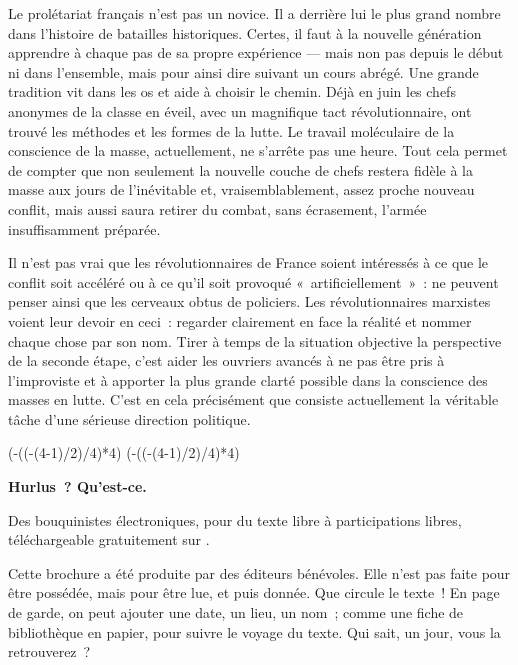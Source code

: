 \documentclass[french,twoside]{book} %
\newcommand\chapterclose{} %
\def\truncdiv#1#2{((#1-(#2-1)/2)/#2)}
\def\moduloop#1#2{(#1-\truncdiv{#1}{#2}*#2)}
\def\modulo#1#2{\number\numexpr\moduloop{#1}{#2}\relax}
\begin{document}
Le prolétariat français n’est pas un novice. Il a derrière lui le plus grand nombre dans l’histoire de batailles historiques. Certes, il faut à la nouvelle génération apprendre à chaque pas de sa propre expérience — mais non pas depuis le début ni dans l’ensemble, mais pour ainsi dire suivant un cours abrégé. Une grande tradition vit dans les os et aide à choisir le chemin. Déjà en juin les chefs anonymes de la classe en éveil, avec un magnifique tact révolutionnaire, ont trouvé les méthodes et les formes de la lutte. Le travail moléculaire de la conscience de la masse, actuellement, ne s’arrête pas une heure. Tout cela permet de compter que non seulement la nouvelle couche de chefs restera fidèle à la masse aux jours de l’inévitable et, vraisemblablement, assez proche nouveau conflit, mais aussi saura retirer du combat, sans écrasement, l’armée insuffisamment préparée.\par
Il n’est pas vrai que les révolutionnaires de France soient intéressés à ce que le conflit soit accéléré ou à ce qu’il soit provoqué « artificiellement » : ne peuvent penser ainsi que les cerveaux obtus de policiers. Les révolutionnaires marxistes voient leur devoir en ceci : regarder clairement en face la réalité et nommer chaque chose par son nom. Tirer à temps de la situation objective la  perspective de la seconde étape, c’est aider les ouvriers avancés à ne pas être pris à l’improviste et à apporter la plus grande clarté possible dans la conscience des masses en lutte. C’est en cela précisément que consiste actuellement la véritable tâche d’une sérieuse direction politique.
\chapterclose

 


\ifbooklet
  \pagestyle{empty}
  \clearpage
  \ifnum\modulo{\value{page}}{4}=0 \hbox{}\newpage\hbox{}\newpage\fi
  \ifnum\modulo{\value{page}}{4}=1 \hbox{}\newpage\hbox{}\newpage\fi


  \hbox{}\newpage
  \ifodd\value{page}\hbox{}\newpage\fi
  {\centering\color{rubric}\bfseries\noindent\large
    Hurlus ? Qu’est-ce.\par
    \bigskip
  }
  \noindent Des bouquinistes électroniques, pour du texte libre à participations libres,
  téléchargeable gratuitement sur \href{https://hurlus.fr}{}.\par
  \bigskip
  \noindent Cette brochure a été produite par des éditeurs bénévoles.
  Elle n’est pas faite pour être possédée, mais pour être lue, et puis donnée.
  Que circule le texte !
  En page de garde, on peut ajouter une date, un lieu, un nom ;
  comme une fiche de bibliothèque en papier,
  pour suivre le voyage du texte. Qui sait, un jour, vous la retrouverez ?
  \par
\end{document}
